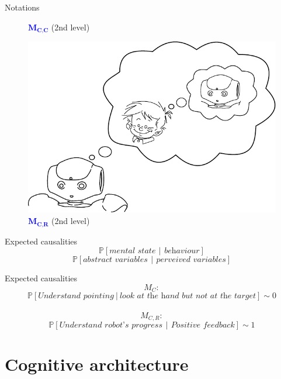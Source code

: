 \documentclass[compress]{beamer}
\newcommand\given[1][]{\:#1\vert\:}
\begin{document}
\begin{frame}{Notations}
\begin{figure}[!tbp]
\begin{minipage}[b]{.4\textwidth}
		\caption{\textcolor{blue}{$\textbf{M}_{\textbf{C,C}}$} (2nd level)}
	\end{minipage}
	\hfill
	\begin{minipage}[b]{.4\textwidth}
		\includegraphics[width=0.8\columnwidth]{naoMM2}
		\caption{\textcolor{blue}{$\textbf{M}_{\textbf{C,R}}$} (2nd level)}
	\end{minipage}
	
\end{figure}


\end{frame}


\begin{frame}{Expected causalities}
$$ \mathbb{P}\left[\textit{mental state}\,\given[\Big]\,\textit{behaviour}\right]$$
$$ \mathbb{P}\left[\textit{abstract variables}\,\given[\Big]\,\textit{perveived variables}\right]$$
\end{frame}

\begin{frame}{Expected causalities}
$$M_{C}:$$
$$ \mathbb{P}\left[ \textit{Understand pointing} \given[\Big] \textit{look at the hand but not at the target}\right]\sim 0$$\\
$$ M_{C,R}:$$
$$ \mathbb{P}\left[\textit{Understand robot's progress}\,\given[\Big]\,\textit{Positive feedback}\right]\sim 1$$
\end{frame}


\section{Cognitive architecture}
\end{document}
